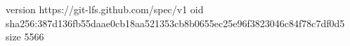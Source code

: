 version https://git-lfs.github.com/spec/v1
oid sha256:387d136fb55daae0cb18aa521353cb8b0655ec25e96f3823046c84f78c7df0d5
size 5566
